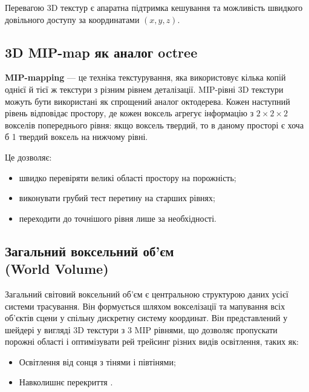 Перевагою 3D текстур є апаратна підтримка кешування та можливість швидкого довільного доступу за координатами $(x, y, z)$.

\subsection{3D MIP-map як аналог octree}

\textbf{MIP-mapping} --- це техніка текстурування, яка використовує кілька копій однієї й тієї ж текстури з різним рівнем деталізації. MIP-рівні 3D текстури можуть бути використані як спрощений аналог октодерева. Кожен наступний рівень відповідає простору, де кожен воксель агрегує інформацію з $2 \times 2 \times 2$ вокселів попереднього рівня: якщо воксель твердий, то в даному просторі є хоча б 1 твердий воксель на нижчому рівні.

\begin{figure}[ht]
    \centering
    
    \caption{}
    \label{fig:mip_octree}
\end{figure}

Це дозволяє:
\begin{itemize}[itemsep=0pt, topsep=0pt, label=$\diamond$]
    \item швидко перевіряти великі області простору на порожність;
    \item виконувати грубий тест перетину на старших рівнях;
    \item переходити до точнішого рівня лише за необхідності.
\end{itemize}

\subsection{Загальний воксельний об'єм\\(World Volume)}

Загальний світовий воксельний об'єм є центральною структурою даних усієї системи трасування. Він формується шляхом вокселізації та мапування всіх об'єктів сцени у спільну дискретну систему координат. Він представлений у шейдері у вигляді 3D текстури з 3 MIP рівнями, що дозволяє пропускати порожні області і оптимізувати рей трейсинг різних видів освітлення, таких як:
\begin{itemize}[itemsep=0pt, topsep=0pt, label=$\diamond$]
    \item Освітлення від сонця з тінями і півтінями;
    \item Навколишнє перекриття .
\end{itemize}

